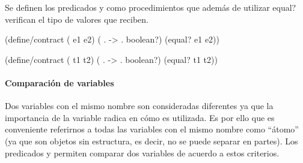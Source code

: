 \documentclass[letterpaper, twoside, openright, 11pt]{book}%
\begin{document}
Se definen los predicados {\Tt{}\nwendquote} y {\Tt{}\nwendquote} como procedimientos que además de utilizar {\Tt{}equal?\nwendquote} verifican el tipo de valores que reciben.

\nwenddocs{}\endmoddef\nwstartdeflinemarkup{}\nwenddeflinemarkup
(define/contract ( e1 e2)
  (  . -> . boolean?)
  (equal? e1 e2))

(define/contract ( t1 t2)
  (  . -> . boolean?)
  (equal? t1 t2))
\eatline
{}\nwendcode{}\nwdocspar

\paragraph{Comparación de variables} Dos variables con el mismo nombre son consideradas diferentes ya que la importancia de la variable radica en cómo es utilizada. Es por ello que es conveniente referirnos a todas las variables con el mismo nombre como ``átomo'' (ya que son objetos sin estructura, es decir, no se puede separar en partes). Los predicados {\Tt{}\nwendquote} y {\Tt{}\nwendquote} permiten comparar dos variables de acuerdo a estos criterios.
\end{document}
